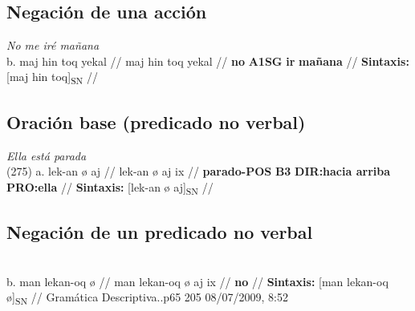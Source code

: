 \documentclass{article}%
\begin{document}
\subsection{Negación de una acción}%
\label{subsec:Negacindeunaaccin}%

%
\par\medskip%
\ex
\textit{No me iré mañana} \\
\begingl
\gla b. maj hin toq yekal //
\glb maj hin toq yekal //
\glc \textbf{no} \textbf{A1SG} \textbf{ir} \textbf{mañana} //
\glft \textbf{Sintaxis:} [maj hin toq]\textsubscript{SN} //
\endgl
\xe
%
\medskip%
\subsection{Oración base (predicado no verbal)}%
\label{subsec:Oracinbase(predicadonoverbal)}%

%
\par\medskip%
\ex
\textit{Ella está parada} \\
\begingl
\gla (275) a. lek-an ø aj //
\glb lek-an ø aj ix //
\glc \textbf{parado-POS} \textbf{B3} \textbf{DIR:hacia arriba} \textbf{PRO:ella} //
\glft \textbf{Sintaxis:} [lek-an ø aj]\textsubscript{SN} //
\endgl
\xe
%
\medskip%
\subsection{Negación de un predicado no verbal}%
\label{subsec:Negacindeunpredicadonoverbal}%

%
\par\medskip%
\ex
\textit{} \\
\begingl
\gla b. man lekan-oq ø //
\glb man lekan-oq ø aj ix //
\glc \textbf{no} \textbf{} \textbf{} \textbf{} //
\glft \textbf{Sintaxis:} [man lekan-oq ø]\textsubscript{SN} //
\endgl
\xe
%
\medskip%
Gramática Descriptiva..p65 %
205 %
08/07/2009, 8:52 

%
\end{document}
